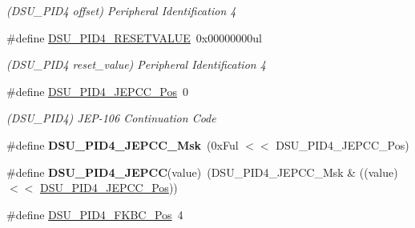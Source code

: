 \begin{DoxyCompactItemize}
\begin{DoxyCompactList}\small\item\em (D\+S\+U\+\_\+\+P\+I\+D4 offset) Peripheral Identification 4 \end{DoxyCompactList}\item 
\hypertarget{group___s_a_m_l21___d_s_u_gabff45dc09472f6ef982d193afd7841cc}{}\#define \hyperlink{group___s_a_m_l21___d_s_u_gabff45dc09472f6ef982d193afd7841cc}{D\+S\+U\+\_\+\+P\+I\+D4\+\_\+\+R\+E\+S\+E\+T\+V\+A\+L\+U\+E}~0x00000000ul\label{group___s_a_m_l21___d_s_u_gabff45dc09472f6ef982d193afd7841cc}

\begin{DoxyCompactList}\small\item\em (D\+S\+U\+\_\+\+P\+I\+D4 reset\+\_\+value) Peripheral Identification 4 \end{DoxyCompactList}\item 
\hypertarget{group___s_a_m_l21___d_s_u_ga09592aca2e0907f95a7a1b7898f77734}{}\#define \hyperlink{group___s_a_m_l21___d_s_u_ga09592aca2e0907f95a7a1b7898f77734}{D\+S\+U\+\_\+\+P\+I\+D4\+\_\+\+J\+E\+P\+C\+C\+\_\+\+Pos}~0\label{group___s_a_m_l21___d_s_u_ga09592aca2e0907f95a7a1b7898f77734}

\begin{DoxyCompactList}\small\item\em (D\+S\+U\+\_\+\+P\+I\+D4) J\+E\+P-\/106 Continuation Code \end{DoxyCompactList}\item 
\hypertarget{group___s_a_m_l21___d_s_u_ga2a82152e8d4b608bac249b7a20648725}{}\#define {\bfseries D\+S\+U\+\_\+\+P\+I\+D4\+\_\+\+J\+E\+P\+C\+C\+\_\+\+Msk}~(0x\+Ful $<$$<$ D\+S\+U\+\_\+\+P\+I\+D4\+\_\+\+J\+E\+P\+C\+C\+\_\+\+Pos)\label{group___s_a_m_l21___d_s_u_ga2a82152e8d4b608bac249b7a20648725}

\item 
\hypertarget{group___s_a_m_l21___d_s_u_ga5fd67c05238d1180cab16bd3363d12e3}{}\#define {\bfseries D\+S\+U\+\_\+\+P\+I\+D4\+\_\+\+J\+E\+P\+C\+C}(value)~(D\+S\+U\+\_\+\+P\+I\+D4\+\_\+\+J\+E\+P\+C\+C\+\_\+\+Msk \& ((value) $<$$<$ \hyperlink{group___s_a_m_l21___d_s_u_ga09592aca2e0907f95a7a1b7898f77734}{D\+S\+U\+\_\+\+P\+I\+D4\+\_\+\+J\+E\+P\+C\+C\+\_\+\+Pos}))\label{group___s_a_m_l21___d_s_u_ga5fd67c05238d1180cab16bd3363d12e3}

\item 
\hypertarget{group___s_a_m_l21___d_s_u_gaa75dd4a5e3f39a78aacfe256a1db4df9}{}\#define \hyperlink{group___s_a_m_l21___d_s_u_gaa75dd4a5e3f39a78aacfe256a1db4df9}{D\+S\+U\+\_\+\+P\+I\+D4\+\_\+\+F\+K\+B\+C\+\_\+\+Pos}~4\label{group___s_a_m_l21___d_s_u_gaa75dd4a5e3f39a78aacfe256a1db4df9}


\end{DoxyCompactItemize}
